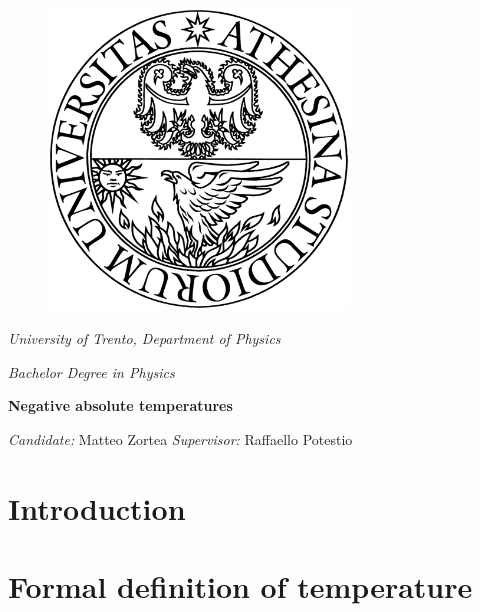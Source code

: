 \documentclass[12pt, a4paper, twoside]{Thesis} %
\title{\ttitle} %
\begin{document}
\pagestyle{fancy} %

\begin{titlepage}
    \vfill
    \begin{figure}[h]
        \centering
        \includegraphics[width=8cm]{./images/unitnlogo.png}
        \label{fig:logo}
    \end{figure}
    \vspace{5pt}
    \centerline{\itshape\huge University of Trento, Department of Physics}
    \vspace{10pt}
    \centerline{\emph{\huge Bachelor Degree in Physics}}
    \vspace{100pt}
    \centerline{\bfseries\Huge Negative absolute temperatures}
    \vspace{100pt}
    \centerline{\Large \hspace{100pt} \textit{Candidate:} Matteo Zortea
    \hspace{50pt} \textit{Supervisor:} Raffaello Potestio \hspace{100pt}}
    \vfill
\end{titlepage}

\hypersetup{linkcolor=black}
\tableofcontents
\newpage
\hypersetup{linkcolor=cyan}

\section*{Introduction}


\newpage

\section{Formal definition of temperature}
\label{sec:temperature}

\end{document}
